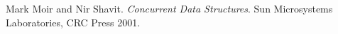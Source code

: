 \begin{thebibliography}{9}
Mark Moir and Nir Shavit. 
\textit{Concurrent Data Structures}. 
Sun Microsystems Laboratories, CRC Press 2001.
\end{thebibliography}